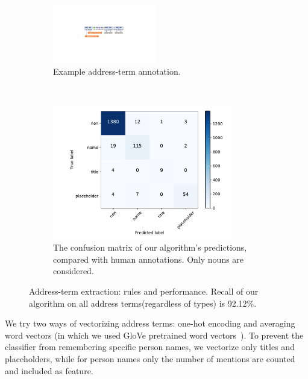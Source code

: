 \begin{figure}[t!]
	\centering
	\begin{subfigure}[t]{0.5\textwidth}
		\centering
		\includegraphics[height=1in]{add-sample.pdf}
		\caption{Example address-term annotation.}
	\end{subfigure}%
	\\
	\begin{subfigure}[t]{0.5\textwidth}
		\centering
		\includegraphics[height=2.3in]{confusion.pdf}
		\caption{The confusion matrix of our algorithm's predictions, compared with human annotations. Only nouns are considered.}
	\end{subfigure}
	\caption{Address-term extraction: rules and performance. Recall of our algorithm on all address terms(regardless of types) is 92.12\%.}\label{fig:address}
\end{figure}

We try two ways of vectorizing address terms: one-hot encoding and 
averaging word vectors (in which we used GloVe pretrained word 
vectors~\cite{glove}). To prevent the classifier from remembering specific person names, 
we vectorize only titles and placeholders, 
while for person names only the number of mentions are counted and
included as feature.

